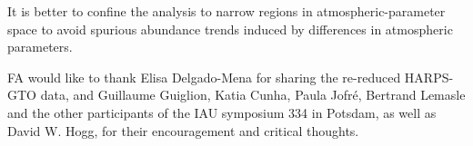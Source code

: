\documentclass{aa}  %
\begin{document}
It is better to confine the analysis to narrow regions in atmospheric-parameter space to avoid spurious abundance trends induced by differences in atmospheric parameters. 







\begin{acknowledgements}
FA would like to thank Elisa Delgado-Mena for sharing the re-reduced HARPS-GTO data, and Guillaume Guiglion, Katia Cunha, Paula Jofr\'e, Bertrand Lemasle and the other participants of the IAU symposium 334 in Potsdam, as well as David W. Hogg, for their encouragement and critical thoughts. 

\end{acknowledgements}

\end{document}
